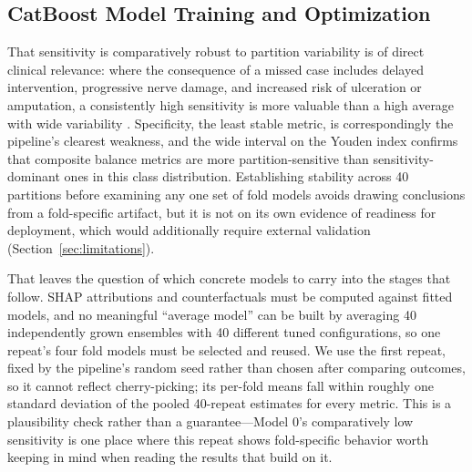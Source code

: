 \documentclass[pdflatex,sn-mathphys-num]{sn-jnl}%
\theoremstyle{thmstyleone}%
\theoremstyle{thmstyletwo}%
\theoremstyle{thmstylethree}%
\begin{document}
\subsection{CatBoost Model Training and Optimization}
\label{sec:foldchoice}

That sensitivity is comparatively robust to partition variability is of direct clinical relevance:
where the consequence of a missed case includes delayed intervention, progressive nerve damage, and
increased risk of ulceration or amputation, a consistently high sensitivity is more valuable than a
high average with wide variability \cite{tesfaye2010diabetic}. Specificity, the least stable metric,
is correspondingly the pipeline's clearest weakness, and the wide interval on the Youden index
confirms that composite balance metrics are more partition-sensitive than sensitivity-dominant ones
in this class distribution. Establishing stability across 40 partitions before examining any one set
of fold models avoids drawing conclusions from a fold-specific artifact, but it is not on its own
evidence of readiness for deployment, which would additionally require external validation
(Section~\ref{sec:limitations}).

That leaves the question of which concrete models to carry into the stages that follow. SHAP
attributions and counterfactuals must be computed against fitted models, and no
meaningful ``average model'' can be built by averaging 40 independently grown ensembles with 40
different tuned configurations, so one repeat's four fold models must be selected and reused. We use
the first repeat, fixed by the pipeline's random seed rather than chosen after comparing outcomes, so
it cannot reflect cherry-picking; its per-fold means fall within roughly one standard deviation of
the pooled 40-repeat estimates for every metric. This is a plausibility check rather than a
guarantee---Model 0's comparatively low sensitivity is one place where this repeat shows fold-specific
behavior worth keeping in mind when reading the results that build on it.
\end{document}
